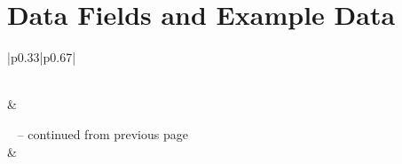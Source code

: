 \chapter{Data Fields and Example Data}



\begin{longtable}{|p{}|p{}|}
	\toprule\noalign{}
	\caption{Fields of Projects}
	\label{tab:appendix-fields-meaning}                                                                      \\

	\hline
	 &                              \\
	\hline
	\endfirsthead

	{{\tablename\ \thetable{} -- continued from previous page}}                                              \\
	\hline
	 &                              \\
	\hline
	\endhead

	\hline
	                                                           \\ \hline
	\endfoot

	\hline \hline
	\endlastfoot


\end{longtable}
